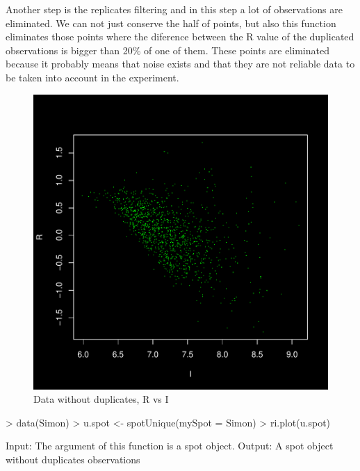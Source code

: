 \documentclass[12pt]{article}
\begin{document}
Another step is the replicates filtering and in this step a lot of observations are eliminated. We can not just conserve the half of points, but also this function eliminates those points where the diference between the R value of the duplicated observations is bigger than 20\% of one of them. These points are eliminated because it probably means that noise exists and that they are not reliable data to be taken into account in the experiment.
\begin{figure}[h]
\begin{center}
\includegraphics{example-genArise-013}
\caption{Data without duplicates, R vs I\label{fig10}}
\end{center}
\end{figure}
\begin{Scode}
> data(Simon)
> u.spot <- spotUnique(mySpot = Simon)
> ri.plot(u.spot)
\end{Scode}

\begin{Soutput}
Input: The argument of this function is a spot object.
Output: A spot object without duplicates observations
\end{Soutput}
\end{document}
